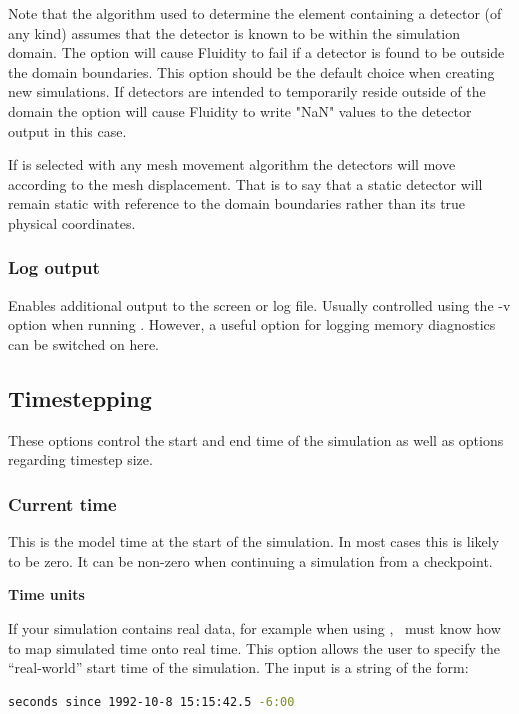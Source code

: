 Note that the algorithm used to determine the element containing a detector (of
any kind) assumes that the detector is known to be within the simulation domain.
The option  will cause Fluidity to fail if a detector
is found to be outside the domain boundaries.
This option should be the default choice when creating new simulations.
If detectors are intended to temporarily reside outside of the domain the option
 will cause Fluidity to write "NaN" values
to the detector output in this case.

If  is selected with any mesh movement algorithm the
detectors will move according to the mesh displacement.
That is to say that a static detector will remain static with reference to the
domain boundaries rather than its true physical coordinates.

\subsubsection{Log output}

Enables additional output to the screen or log file. Usually controlled
using the -v option when running \fluidity. However, a useful option for
logging memory diagnostics can be switched on here.

\subsection{Timestepping}
These options control the start and end time of the simulation as well as options regarding timestep size.

\subsubsection{Current time}
This is the model time at the start of the simulation. In most cases this is likely to be zero. It can be non-zero when continuing a simulation from a checkpoint.

\textbf{Time units}

If your simulation contains real data, for example when using
, \fluidity\ must know how to map simulated time onto
real time. This option allows the user to specify the ``real-world'' start
time of the simulation.  The input is a string of the form:
\begin{lstlisting}[language=bash]
seconds since 1992-10-8 15:15:42.5 -6:00
\end{lstlisting}

